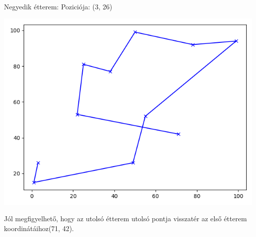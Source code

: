 Negyedik étterem:
Poziciója: (3, 26)

\includegraphics[scale=0.8]{images/tsp4MR.png}

Jól megfigyelhető, hogy az utolsó étterem utolsó pontja visszatér az első étterem koordinátáihoz(71, 42).